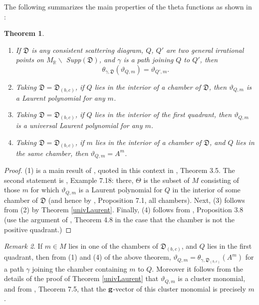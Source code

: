 \documentclass[11pt]{amsart}
\newtheorem{theorem}{Theorem}[section]
\theoremstyle{remark}
\newtheorem{remark}[theorem]{Remark}
\numberwithin{equation}{section}
\newcommand{\RR}{\mathbb{R}}
\newcommand{\fD}{\mathfrak{D}}
\begin{document}
The following summarizes the main properties of the theta functions as shown in
\cite{GHKK}:
\begin{theorem} $ $
  \begin{enumerate}
    \item
      If $\fD$ is any consistent scattering diagram, $Q$, $Q'$ are two general
      irrational points on $M_{\RR} \backslash$ Supp$(\fD)$, and $\gamma$ is a
      path joining $Q$ to $Q'$, then 
      \[
        \theta_{\gamma, \fD }(\vartheta_{Q,m}) = \vartheta_{Q', m}. 
      \]
    
    \item 
      Taking $\fD=\fD_{(b,c)}$, if $Q$ lies in the interior of a chamber of
      $\fD$, then $\vartheta_{Q,m}$ is a Laurent polynomial for any $m$.
    
    \item 
      Taking $\fD=\fD_{(b,c)}$, if $Q$ lies in the interior of the first
      quadrant, then $\vartheta_{Q,m}$ is a universal Laurent polynomial for
      any $m$.

    \item 
      Taking $\fD=\fD_{(b,c)}$, if $m$ lies in the interior of a chamber of
      $\fD$, and $Q$ lies in the same chamber, then $\vartheta_{Q,m}=A^{m}$.
   
  \end{enumerate}
\end{theorem}

\begin{proof}
  (1) is a main result of \cite{CPS}, quoted in this context in \cite{GHKK},
  Theorem 3.5.  The second statement is \cite{GHKK}, Example 7.18: there,
  $\Theta$ is the subset of $M$ consisting of those $m$ for which
  $\vartheta_{Q,m}$ is a Laurent polynomial for $Q$ in the interior of 
  some chamber of $\fD$ (and hence by \cite{GHKK}, Proposition 7.1, all 
  chambers).
  Next, (3) follows from (2) by Theorem \ref{univLaurent}. 
  Finally, (4) follows from \cite{GHKK}, Proposition 3.8 (use the argument of
  \cite{GHKK}, Theorem 4.8 in the case that the chamber is not the positive
  quadrant.)
\end{proof}

\begin{remark} 
  \label{rk:theta functions g-vector}
  If $m\in M$ lies in one of the chambers of $\fD_{(b,c)}$, and $Q$ lies in
  the first quadrant, then from (1) and (4) of the above theorem,
  $\vartheta_{Q,m}=\theta_{\gamma,\fD_{(b,c)}}(A^{m})$ for a path $\gamma$
  joining the chamber containing $m$ to $Q$. Moreover it follows from the
  details of the proof of Theorem \ref{univLaurent} that $\vartheta_{Q,m}$ is
  a cluster monomial, and from \cite{GHKK}, Theorem 7.5, that the 
  ${\bf g}$-vector of this cluster monomial is precisely $m$. 
\end{remark}
\end{document}

